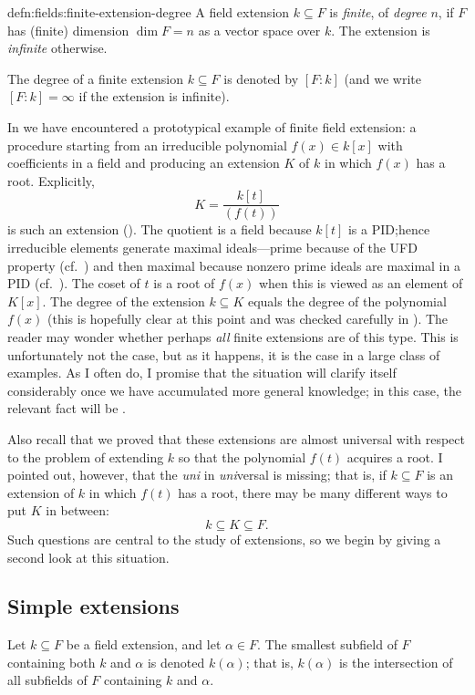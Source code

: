 \begin{defn}{}{defn:fields:finite-extension-degree}
  A field extension $k \subseteq F$ is \emph{finite}, of \emph{degree}
  $n$, if $F$ has (finite) dimension $\dim F = n$ as a vector space
  over $k$. The extension is \emph{infinite} otherwise.

  The degree of a finite extension $k \subseteq F$ is denoted by
  $[F : k]$ (and we write $[F : k] = \infty$ if the extension is
  infinite).
\end{defn}
In  we
have encountered a prototypical example of finite field extension: a
procedure starting from an irreducible polynomial $f(x) \in k[x]$ with
coefficients in a field and producing an extension $K$ of $k$ in which
$f(x)$ has a root. Explicitly,
\[K = \frac{k[t]}{(f(t))}\] is such an extension
(). The quotient is a field because $k[t]$ is a
PID;\@ hence irreducible elements generate maximal ideals---prime
because of the UFD property (cf.\ ) and then
maximal because nonzero prime ideals are maximal in a PID (cf.\
). The coset of $t$ is a root of
$f(x)$ when this is viewed as an element of $K[x]$. The degree of the
extension $k \subseteq K$ equals the degree of the polynomial $f(x)$
(this is hopefully clear at this point and was checked carefully in
\Cref{prop:rings:poly-group-iso}).  The reader may wonder whether
perhaps \emph{all} finite extensions are of this type. This is
unfortunately not the case, but as it happens, it is the case in a
large class of examples. As I often do, I promise that the situation
will clarify itself considerably once we have accumulated more general
knowledge; in this case, the relevant fact will be
.

Also recall that we proved that these extensions are almost universal
with respect to the problem of extending $k$ so that the polynomial
$f(t)$ acquires a root. I pointed out, however, that the \emph{uni} in
\emph{uni}versal is missing; that is, if $k \subseteq F$ is an
extension of $k$ in which $f(t)$ has a root, there may be many
different ways to put $K$ in between:
\[k \subseteq K \subseteq F.\] Such questions are central to the study
of extensions, so we begin by giving a second look at this situation.

\subsection{Simple extensions}%
\label{subsec:fields:simple-extensions}
Let $k \subseteq F$ be a field extension, and let $\alpha \in F$. The
smallest subfield of $F$ containing both $k$ and $\alpha$ is denoted
$k(\alpha)$; that is, $k(\alpha)$ is the intersection of all subfields
of $F$ containing $k$ and $\alpha$.

